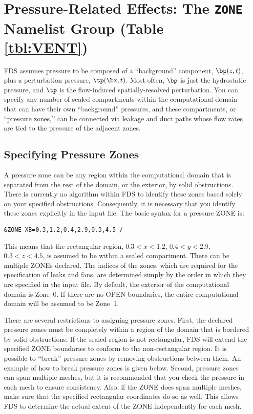 \documentclass[11pt]{book}
\begin{document}
\section{Pressure-Related Effects: The \texorpdfstring{{\tt ZONE}}{ZONE} Namelist Group (Table \ref{tbl:VENT})}
\label{info:ZONE}

FDS assumes pressure to be composed of a ``background'' component, $\bp(z,t)$, plus a perturbation pressure, $\tp(\bx,t)$. Most
often, $\bp$ is just the hydrostatic pressure, and $\tp$ is the flow-induced spatially-resolved perturbation.
You can specify any number of sealed compartments within the computational
domain that can have their own ``background'' pressures, and these compartments, or ``pressure zones,'' can be connected via leakage and duct paths whose
flow rates are tied to the pressure of the adjacent zones.



\subsection{Specifying Pressure Zones}
\label{info:ZONE_Basics}

A pressure zone can be any region within the computational domain that is separated from the rest of the domain, or the exterior,
by solid obstructions. There is currently no algorithm within FDS to identify these zones based solely on your specified obstructions. Consequently, it is
necessary that you identify these zones explicitly in the input file. The basic syntax for a pressure {\ct ZONE} is:
\begin{lstlisting}
&ZONE XB=0.3,1.2,0.4,2.9,0.3,4.5 /
\end{lstlisting}
This means that the rectangular region, $0.3<x<1.2$, $0.4<y<2.9$, $0.3<z<4.5$, is assumed to be within a sealed compartment. There can be multiple {\ct ZONE}s
declared. The indices of the zones, which are required for the specification of leaks and fans, are determined simply by the order in which they are specified in the input file.
By default, the exterior of the computational
domain is Zone~0. If there are no {\ct OPEN} boundaries, the entire computational domain will be assumed to be Zone~1.

There are several restrictions to assigning pressure zones. First, the declared pressure zones must be completely within a region of the
domain that is bordered by solid obstructions. If the sealed region is not rectangular, FDS will extend the specified {\ct ZONE} boundaries to
conform to the non-rectangular region. It is possible to ``break'' pressure zones by removing
obstructions between them. An example of how to break pressure zones is given below.
Second, pressure zones can span multiple meshes, but it is recommended that you check the pressure in each mesh to ensure consistency. Also, if the {\ct ZONE} does span multiple
meshes, make sure that the specified rectangular coordinates do so as well. This allows FDS to determine the actual extent of the {\ct ZONE} independently for each
mesh.
\end{document}
